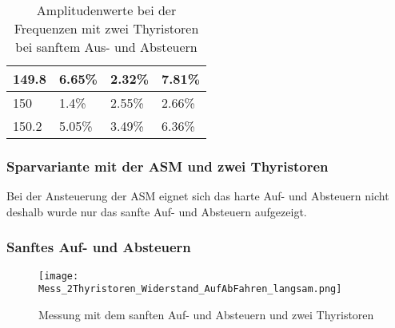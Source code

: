 \begin{table}[ht!]
\begin{tabular}{|l|l|l|l|}
		149.8             & 6.65\%                                                                              & 2.32\%                                                                              & 7.81\%                                                                              \\ \hline
		150               & 1.4\%                                                                               & 2.55\%                                                                              & 2.66\%                                                                              \\ \hline
		150.2             & 5.05\%                                                                              & 3.49\%                                                                              & 6.36\%                                                                              \\ \hline
	\end{tabular}
\caption{Amplitudenwerte bei der Frequenzen mit zwei Thyristoren bei sanftem Aus- und Absteuern}\label{tab:Mess_2Thyristoren_Spannung_ASM_AufAb_sanft}
\end{table}
\newpage
\subsubsection{Sparvariante mit der ASM und zwei Thyristoren}
Bei der Ansteuerung der ASM eignet sich das harte Auf- und Absteuern nicht deshalb wurde nur das sanfte Auf- und Absteuern aufgezeigt.
\subsubsection*{Sanftes Auf- und Absteuern}
\begin{figure}[ht!]
	\centering
	\texttt{[image: Mess\_2Thyristoren\_Widerstand\_AufAbFahren\_langsam.png]}	
	\caption{Messung mit dem sanften Auf- und Absteuern und zwei Thyristoren}\label{Mess_2Thyristoren_ASM_AufAbFahren_langsam}	
\end{figure}

\newpage
